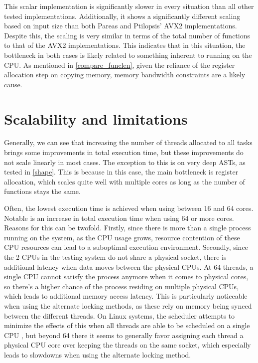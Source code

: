 \documentclass[11pt,dvipsnames]{article}
\begin{document}
This scalar implementation is significantly slower in every situation than all other tested implementations. Additionally, it shows a significantly different scaling based on input size than both Pareas and Ptilopsis' AVX2 implementations. Despite this, the scaling is very similar in terms of the total number of functions to that of the AVX2 implementations. This indicates that in this situation, the bottleneck in both cases is likely related to something inherent to running on the CPU. As mentioned in \autoref{compare_funclen}, given the reliance of the register allocation step on copying memory, memory bandwidth constraints are a likely cause.

\section{Scalability and limitations}
Generally, we can see that increasing the number of threads allocated to all tasks brings some improvements in total execution time, but these improvements do not scale linearly in most cases. The exception to this is on very deep ASTs, as tested in \autoref{shape}. This is because in this case, the main bottleneck is register allocation, which scales quite well with multiple cores as long as the number of functions stays the same.

Often, the lowest execution time is achieved when using between 16 and 64 cores. Notable is an increase in total execution time when using 64 or more cores. Reasons for this can be twofold. Firstly, since there is more than a single process running on the system, as the CPU usage grows, resource contention of these CPU resources can lead to a suboptimal execution environment. Secondly, since the 2 CPUs in the testing system do not share a physical socket, there is additional latency when data moves between the physical CPUs. At 64 threads, a single CPU cannot satisfy the process anymore when it comes to physical cores, so there's a higher chance of the process residing on multiple physical CPUs, which leads to additional memory access latency. This is particularly noticeable when using the alternate locking methods, as these rely on memory being synced between the different threads. On Linux systems, the scheduler attempts to minimize the effects of this when all threads are able to be scheduled on a single CPU \cite{kernelnuma}, but beyond 64 there it seems to generally favor assigning each thread a physical CPU core over keeping the threads on the same socket, which especially leads to slowdowns when using the alternate locking method.
\end{document}
